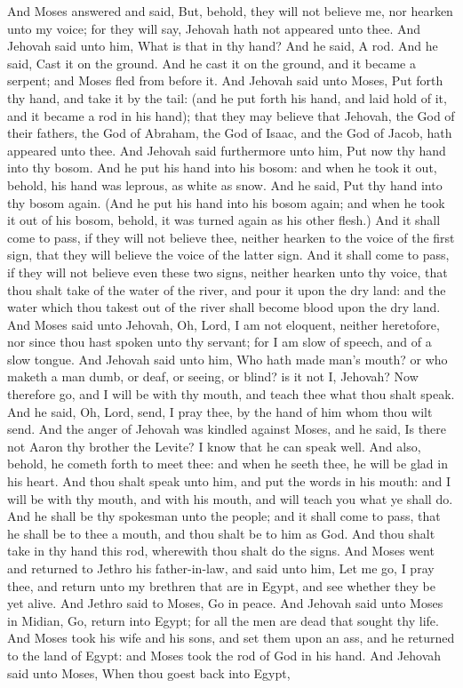 And Moses answered and said, But, behold, they will not believe me, nor hearken unto my voice; for they will say, Jehovah hath not appeared unto thee. And Jehovah said unto him, What is that in thy hand? And he said, A rod. And he said, Cast it on the ground. And he cast it on the ground, and it became a serpent; and Moses fled from before it. And Jehovah said unto Moses, Put forth thy hand, and take it by the tail: (and he put forth his hand, and laid hold of it, and it became a rod in his hand); that they may believe that Jehovah, the God of their fathers, the God of Abraham, the God of Isaac, and the God of Jacob, hath appeared unto thee. And Jehovah said furthermore unto him, Put now thy hand into thy bosom. And he put his hand into his bosom: and when he took it out, behold, his hand was leprous, as white as snow. And he said, Put thy hand into thy bosom again. (And he put his hand into his bosom again; and when he took it out of his bosom, behold, it was turned again as his other flesh.) And it shall come to pass, if they will not believe thee, neither hearken to the voice of the first sign, that they will believe the voice of the latter sign. And it shall come to pass, if they will not believe even these two signs, neither hearken unto thy voice, that thou shalt take of the water of the river, and pour it upon the dry land: and the water which thou takest out of the river shall become blood upon the dry land.  And Moses said unto Jehovah, Oh, Lord, I am not eloquent, neither heretofore, nor since thou hast spoken unto thy servant; for I am slow of speech, and of a slow tongue. And Jehovah said unto him, Who hath made man’s mouth? or who maketh a man dumb, or deaf, or seeing, or blind? is it not I, Jehovah? Now therefore go, and I will be with thy mouth, and teach thee what thou shalt speak. And he said, Oh, Lord, send, I pray thee, by the hand of him whom thou wilt send. And the anger of Jehovah was kindled against Moses, and he said, Is there not Aaron thy brother the Levite? I know that he can speak well. And also, behold, he cometh forth to meet thee: and when he seeth thee, he will be glad in his heart. And thou shalt speak unto him, and put the words in his mouth: and I will be with thy mouth, and with his mouth, and will teach you what ye shall do. And he shall be thy spokesman unto the people; and it shall come to pass, that he shall be to thee a mouth, and thou shalt be to him as God. And thou shalt take in thy hand this rod, wherewith thou shalt do the signs.  And Moses went and returned to Jethro his father-in-law, and said unto him, Let me go, I pray thee, and return unto my brethren that are in Egypt, and see whether they be yet alive. And Jethro said to Moses, Go in peace. And Jehovah said unto Moses in Midian, Go, return into Egypt; for all the men are dead that sought thy life. And Moses took his wife and his sons, and set them upon an ass, and he returned to the land of Egypt: and Moses took the rod of God in his hand. And Jehovah said unto Moses, When thou goest back into Egypt, 